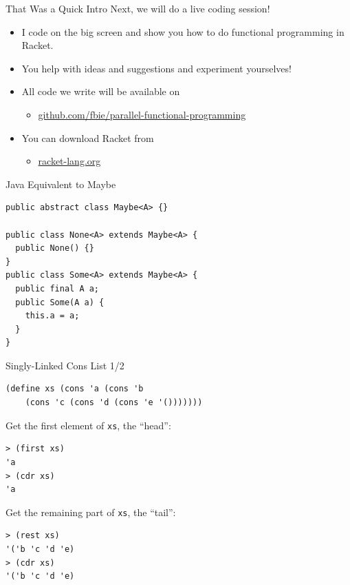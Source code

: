 \documentclass{beamer}
\begin{document}
\begin{frame}{That Was a Quick Intro}
  Next, we will do a live coding session!

  \begin{itemize}
  \pause{} \item I code on the big screen and show you how to do functional programming in Racket.
  \pause{} \item You help with ideas and suggestions and experiment yourselves!
  \pause{} \item All code we write will be available on
  \begin{itemize}
  \item \url{github.com/fbie/parallel-functional-programming}
  \end{itemize}
  \pause{} \item You can download Racket from
  \begin{itemize}
  \item \url{racket-lang.org}
  \end{itemize}
  \end{itemize}
\end{frame}

\begin{frame}[fragile]{Java Equivalent to Maybe}
\begin{lstlisting}[style=Java]
public abstract class Maybe<A> {}

public class None<A> extends Maybe<A> {
  public None() {}
}
public class Some<A> extends Maybe<A> {
  public final A a;
  public Some(A a) {
    this.a = a;
  }
}
\end{lstlisting}
\end{frame}

\begin{frame}[fragile]{Singly-Linked Cons List 1/2}
\begin{lstlisting}
(define xs (cons 'a (cons 'b
    (cons 'c (cons 'd (cons 'e '()))))))
\end{lstlisting}

\pause{}

Get the first element of \lstinline{xs}, the ``head'':

\begin{lstlisting}
> (first xs)
'a
> (cdr xs)
'a
\end{lstlisting}

\pause{}

Get the remaining part of \lstinline{xs}, the ``tail'':

\begin{lstlisting}
> (rest xs)
'('b 'c 'd 'e)
> (cdr xs)
'('b 'c 'd 'e)
\end{lstlisting}
\end{frame}
\end{document}
